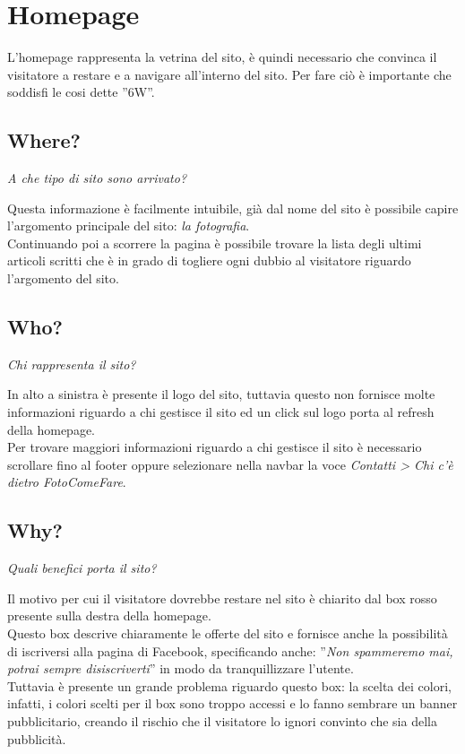 \section{Homepage}\label{homepage}
L'homepage rappresenta la vetrina del sito, è quindi necessario che convinca il visitatore a restare e a navigare all'interno del sito. Per fare ciò è importante che soddisfi le cosi dette ''6W''.

\subsection{Where?}
\begin{center}
\textit{A che tipo di sito sono arrivato?}
\end{center}

Questa informazione è facilmente intuibile, già dal nome del sito è possibile capire l'argomento principale del sito: \textit{la fotografia}.\\
Continuando poi a scorrere la pagina è possibile trovare la lista degli ultimi articoli scritti che è in grado di togliere ogni dubbio al visitatore riguardo l'argomento del sito.

\subsection{Who?}

\begin{center}
\textit{Chi rappresenta il sito?}
\end{center}

In alto a sinistra è presente il logo del sito, tuttavia questo non fornisce molte informazioni riguardo a chi gestisce il sito ed un click sul logo porta al refresh della homepage.\\
Per trovare maggiori informazioni riguardo a chi gestisce il sito è necessario scrollare fino al footer oppure selezionare nella navbar la voce \textit{Contatti > Chi c'è dietro FotoComeFare}.

\subsection{Why?}
\begin{center}
\textit{Quali benefici porta il sito?}
\end{center}

Il motivo per cui il visitatore dovrebbe restare nel sito è chiarito dal box rosso presente sulla destra della homepage. \\
Questo box descrive chiaramente le offerte del sito e fornisce anche la possibilità di iscriversi alla pagina di Facebook, specificando anche: ''\textit{Non spammeremo mai, potrai sempre disiscriverti}'' in modo da tranquillizzare l'utente.\\
Tuttavia è presente un grande problema riguardo questo box: la scelta dei colori, infatti, i colori scelti per il box sono troppo accessi e lo fanno sembrare un banner pubblicitario, creando il rischio che il visitatore lo ignori convinto che sia della pubblicità.


